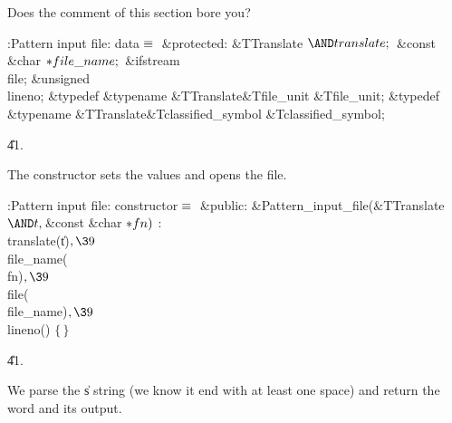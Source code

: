 Does the comment of this section bore you?

\Y\B\4:Pattern input file: data\X${}\equiv{}$\6
\4\&{protected}:\6
\&{TTranslate} ${}{\AND}\\{translate};{}$\6
\&{const} \&{char} ${}{*}\\{file\_name};{}$\6
\&{ifstream} \\{file};\6
\&{unsigned} \\{lineno};\6
\&{typedef} \&{typename} \&{TTranslate}\DC\&{Tfile\_unit} \&{Tfile\_unit};\6
\&{typedef} \&{typename} \&{TTranslate}\DC\&{Tclassified\_symbol} %
\&{Tclassified\_symbol};\par
\U41.\fi

The constructor sets the values and opens the file.

\Y\B\4:Pattern input file: constructor\X${}\equiv{}$\6
\4\&{public}:\6
\&{Pattern\_input\_file}(\&{TTranslate} ${}{\AND}\|t,\39{}$\&{const} \&{char}
${}{*}\\{fn}){}$\1\1\2\2\6
: \\{translate}(\|t)${},\39{}$ \\{file\_name}(\\{fn})${},\39{}$ \\{file}(%
\\{file\_name})${},\39{}$ \\{lineno}() ${}\{\,\}{}$\par
\U41.\fi

We parse the \|s string (we know it end with at least one space) and
return the word and its output.

